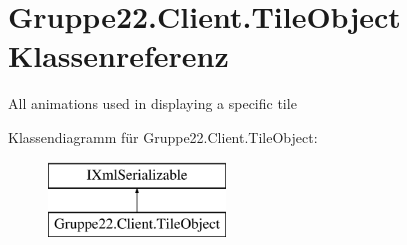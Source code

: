 \hypertarget{class_gruppe22_1_1_client_1_1_tile_object}{\section{Gruppe22.\-Client.\-Tile\-Object Klassenreferenz}
\label{class_gruppe22_1_1_client_1_1_tile_object}
}


All animations used in displaying a specific tile  


Klassendiagramm für Gruppe22.\-Client.\-Tile\-Object\-:\begin{figure}[H]
\begin{center}
\leavevmode
\includegraphics[height=2.000000cm]{class_gruppe22_1_1_client_1_1_tile_object}
\end{center}
\end{figure}
